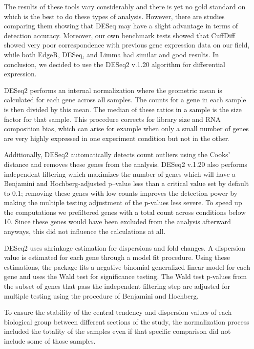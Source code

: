 The results of these tools vary considerably and there is yet no gold standard on which is the best to do these types of analysis. However, there are studies comparing them showing that DESeq may have a slight advantage in terms of detection accuracy.\cite{Seyednasrollah2015} Moreover, our own benchmark tests showed that CuffDiff showed very poor correspondence with previous gene expression data on our field, while both EdgeR, DESeq, and Limma had similar and good results. In conclusion, we decided to use the DESeq2 v.1.20 algorithm for differential expression.\cite{Love2014}

DESeq2 performs an internal normalization where the geometric mean is calculated for each gene across all samples. The counts for a gene in each sample is then divided by this mean. The median of these ratios in a sample is the size factor for that sample. This procedure corrects for library size and RNA composition bias, which can arise for example when only a small number of genes are very highly expressed in one experiment condition but not in the other.

Additionally, DESeq2 automatically detects count outliers using the Cooks' distance and removes these genes from the analysis. DESeq2 v.1.20 also performs independent filtering which maximizes the number of genes which will have a Benjamini and Hochberg-adjusted p–value\cite{Benjamini1995} less than a critical value set by default to 0.1; removing these genes with low counts improves the detection power by making the multiple testing adjustment of the p-values less severe. To speed up the computations we prefiltered genes with a total count across conditions below 10. Since these genes would have been excluded from the analysis afterward anyways, this did not influence the calculations at all.

DESeq2 uses shrinkage estimation for dispersions and fold changes. A dispersion value is estimated for each gene through a model fit procedure. Using these estimations, the package fits a negative binomial generalized linear model for each gene and uses the Wald test for significance testing. The Wald test p-values from the subset of genes that pass the independent filtering step are adjusted for multiple testing using the procedure of Benjamini and Hochberg.\cite{Benjamini1995}

To ensure the stability of the central tendency and dispersion values of each biological group between different sections of the study, the normalization process included the totality of the samples even if that specific comparison did not include some of those samples.

